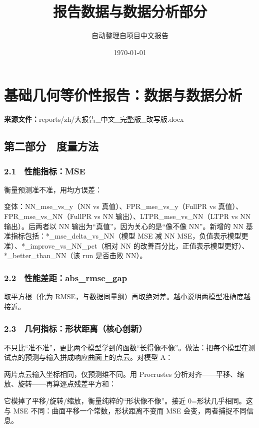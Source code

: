 \documentclass[UTF8,a4paper,11pt]{ctexart}
\title{报告数据与数据分析部分}
\author{自动整理自项目中文报告}
\date{\today}
\begin{document}
\maketitle
\tableofcontents
\newpage
\section{基础几何等价性报告：数据与数据分析}
\noindent\textbf{来源文件：}reports/zh/大报告\_中文\_完整版\_改写版.docx

\subsection{第二部分　度量方法}

\subsubsection{2.1　性能指标：MSE}

衡量预测准不准，用均方误差：

变体：NN\_mse\_vs\_y（NN vs 真值）、FPR\_mse\_vs\_y（FullPR vs 真值）、FPR\_mse\_vs\_NN（FullPR vs NN 输出）、LTPR\_mse\_vs\_NN（LTPR vs NN 输出）。后两者以 NN 输出为“真值”，因为关心的是“像不像 NN”。新增的 NN 基准指标包括：*\_mse\_delta\_vs\_NN（模型 MSE 减 NN MSE，负值表示模型更准）、*\_improve\_vs\_NN\_pct（相对 NN 的改善百分比，正值表示模型更好）、*\_better\_than\_NN（该 run 是否击败 NN）。

\subsubsection{2.2　性能差距：abs\_rmse\_gap}

取平方根（化为 RMSE，与数据同量纲）再取绝对差。越小说明两模型准确度越接近。

\subsubsection{2.3　几何指标：形状距离（核心创新）}

不只比“准不准”，更比两个模型学到的函数“长得像不像”。做法：把每个模型在测试点的预测与输入拼成响应曲面上的点云。对模型 A：

两片点云输入坐标相同，仅预测维不同。用 Procrustes 分析对齐------平移、缩放、旋转------再算逐点残差平方和：

它模掉了平移/旋转/缩放，衡量纯粹的“形状像不像”。接近 0=形状几乎相同。这与 MSE 不同：曲面平移一个常数，形状距离不变而 MSE 会变，两者捕捉不同信息。
\end{document}
